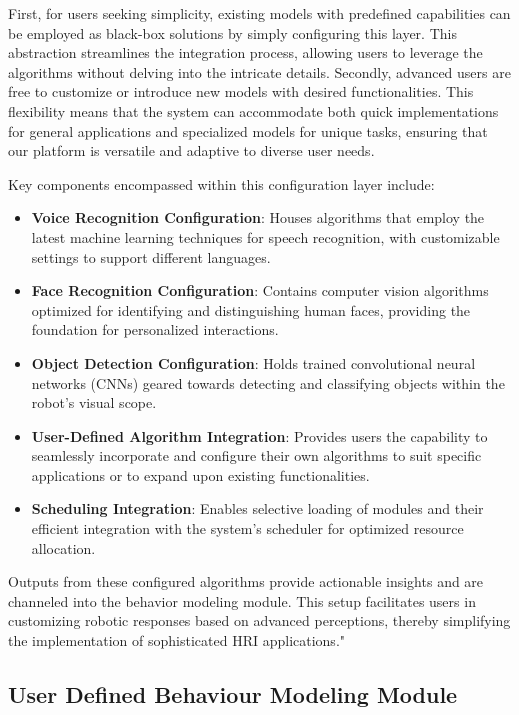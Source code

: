 \documentclass[runningheads]{llncs}
\begin{document}
First, for users seeking simplicity, existing models with predefined capabilities can be employed as black-box solutions by simply configuring this layer. This abstraction streamlines the integration process, allowing users to leverage the algorithms without delving into the intricate details. Secondly, advanced users are free to customize or introduce new models with desired functionalities. This flexibility means that the system can accommodate both quick implementations for general applications and specialized models for unique tasks, ensuring that our platform is versatile and adaptive to diverse user needs.

Key components encompassed within this configuration layer include:

\begin{itemize}
\item \textbf{Voice Recognition Configuration}: Houses algorithms that employ the latest machine learning techniques for speech recognition, with customizable settings to support different languages.
\item \textbf{Face Recognition Configuration}: Contains computer vision algorithms optimized for identifying and distinguishing human faces, providing the foundation for personalized interactions.
\item \textbf{Object Detection Configuration}: Holds trained convolutional neural networks (CNNs) geared towards detecting and classifying objects within the robot's visual scope.
\item \textbf{User-Defined Algorithm Integration}: Provides users the capability to seamlessly incorporate and configure their own algorithms to suit specific applications or to expand upon existing functionalities.
\item \textbf{Scheduling Integration}: Enables selective loading of modules and their efficient integration with the system's scheduler for optimized resource allocation.
\end{itemize}

Outputs from these configured algorithms provide actionable insights and are channeled into the behavior modeling module. This setup facilitates users in customizing robotic responses based on advanced perceptions, thereby simplifying the implementation of sophisticated HRI applications."

\subsection{User Defined Behaviour Modeling Module}
\end{document}

